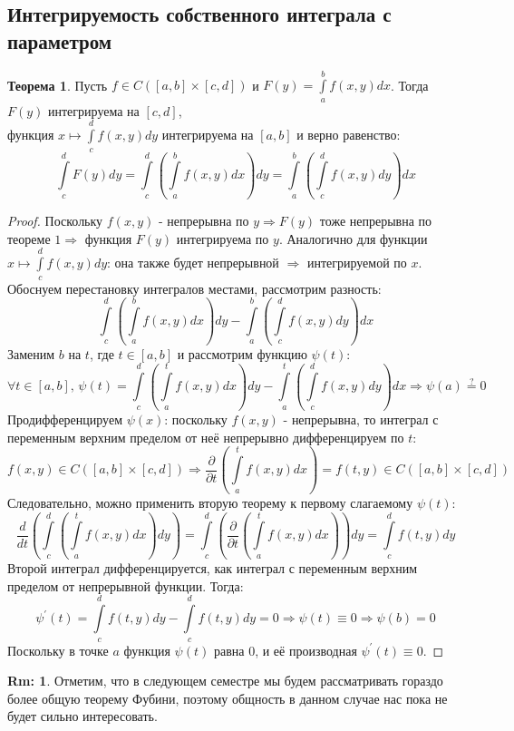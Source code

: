 \documentclass[12pt]{article}
\theoremstyle{definition}
\newtheorem{rem}{Rm:}
\newtheorem{theorem}{Теорема}
\newcommand{\ddint}[2]{\displaystyle\int\limits_{#1}^{#2}}
\begin{document}
\subsection*{Интегрируемость собственного интеграла с параметром}
\begin{theorem}
	Пусть $f \in C([a,b]\times [c,d])$ и $F(y) = \ddint{a}{b}f(x,y)dx$. Тогда $F(y)$ интегрируема на $[c,d]$, \\ функция $x \mapsto \ddint{c}{d}f(x,y)dy$ интегрируема на $[a,b]$ и верно равенство:
	$$
		\ddint{c}{d}F(y)dy = \ddint{c}{d}\left(\ddint{a}{b}f(x,y)dx\right)dy = \ddint{a}{b}\left(\ddint{c}{d}f(x,y)dy\right)dx
	$$
\end{theorem}
\begin{proof}
	Поскольку $f(x,y)$ - непрерывна по $y \Rightarrow F(y)$ тоже непрерывна по теореме $1 \Rightarrow$ функция $F(y)$ интегрируема по  $y$. Аналогично для функции $x \mapsto \ddint{c}{d}f(x,y)dy$: она также будет непрерывной $\Rightarrow$ интегрируемой по $x$. Обоснуем перестановку интегралов местами, рассмотрим разность:
	$$
		 \ddint{c}{d}\left(\ddint{a}{b}f(x,y)dx\right)dy - \ddint{a}{b}\left(\ddint{c}{d}f(x,y)dy\right)dx
	$$
	Заменим $b$ на $t$, где $t \in [a,b]$ и рассмотрим функцию $\psi(t)$:
	$$
		\forall t \in [a,b], \, \psi(t) = \ddint{c}{d}\left(\ddint{a}{t}f(x,y)dx\right)dy - \ddint{a}{t}\left(\ddint{c}{d}f(x,y)dy\right)dx \Rightarrow \psi(a) \overset{?}{=} 0
	$$
	Продифференцируем $\psi(x)$: поскольку $f(x,y)$ - непрерывна, то интеграл с переменным верхним пределом от неё непрерывно дифференцируем по $t$:
	$$
		f(x,y) \in C([a,b]\times [c,d]) \Rightarrow \dfrac{\partial}{\partial t}\left(\ddint{a}{t}f(x,y)dx\right) = f(t,y) \in C([a,b]\times [c,d])
	$$
	Следовательно, можно применить вторую теорему к первому слагаемому $\psi(t)$: 
	$$
		\dfrac{d}{d t}\left(\ddint{c}{d}\left(\ddint{a}{t}f(x,y)dx\right)dy\right) = \ddint{c}{d}\left(\dfrac{\partial}{\partial t}\left(\ddint{a}{t}f(x,y)dx\right)\right)dy = \ddint{c}{d}f(t,y)dy
	$$
	Второй интеграл дифференцируется, как интеграл с переменным верхним пределом от непрерывной функции. Тогда:
	$$
		\psi^\prime(t) = \ddint{c}{d}f(t,y)dy - \ddint{c}{d}f(t,y)dy = 0 \Rightarrow \psi(t) \equiv 0 \Rightarrow \psi(b) = 0
	$$
	Поскольку в точке $a$ функция $\psi(t)$ равна $0$, и её производная $\psi^\prime(t) \equiv 0$.
\end{proof}

\begin{rem}
	Отметим, что в следующем семестре мы будем рассматривать гораздо более общую теорему Фубини, поэтому общность в данном случае нас пока не будет сильно интересовать.
\end{rem}
\end{document}
